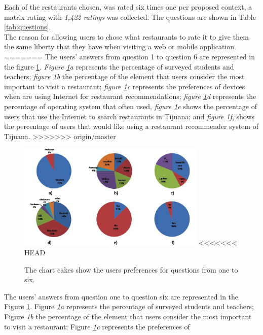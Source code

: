 Each of the restaurants chosen, was rated six times one per proposed 
context, a matrix rating with \textit{1,422 ratings} was collected. The
questions are shown in Table  \ref{tab:questions}. \\The reason for allowing
users to chose what restaurants to rate it to give them the same liberty
that they have when visiting a web or mobile application. 
=======
The users' answers from question 1 to question 6 are represented in
the figure \ref{fig:cakeschart}. \textit{Figure \ref{fig:cakeschart}a}
represents the percentage of surveyed students and teachers;
\textit{figure \ref{fig:cakeschart}b}  the percentage of the element
that users consider the most important to visit a restaurant;
\textit{figure \ref{fig:cakeschart}c} represents the preferences of
devices when are using Internet for restaurant recommendations;
\textit{figure \ref{fig:cakeschart}d} represents the percentage of
operating system that often used, \textit{figure
\ref{fig:cakeschart}e} shows the percentage of users that use the
Internet to search restaurants in Tijuana; and \textit{figure
\ref{fig:cakeschart}f}, shows the percentage of users that would like
using a restaurant recommender system of Tijuana.
>>>>>>> origin/master
\begin{figure}
\captionsetup{justification=centering,margin=2cm,font=footnotesize}
\centering
\setlength\fboxsep{0pt}
\includegraphics[width=0.8\textwidth]{img/cakes.png}
<<<<<<< HEAD
\caption{The chart cakes show the users preferences for questions from one to six.}
\label{fig:cakeschart}     
\end{figure}
The users' answers from question one to question six are represented in
the Figure  \ref{fig:cakeschart}. Figure  \textit{\ref{fig:cakeschart}a}
represents the percentage of surveyed students and teachers;
Figure  \textit{\ref{fig:cakeschart}b}  the percentage of the element
that users consider the most important to visit a restaurant;
Figure  \textit{\ref{fig:cakeschart}c} represents the preferences of
